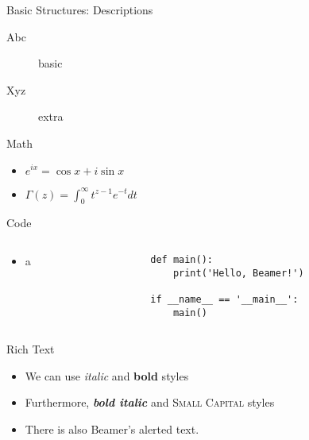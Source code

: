 \documentclass[12pt,t,hyperref={pdfencoding=auto}]{beamer}
\begin{document}
\begin{frame}{Basic Structures: Descriptions}
  \begin{description}
  \item[Abc] basic
  \item[Xyz] extra
  \end{description}
\end{frame}


\begin{frame}[fragile]{Math}
  \begin{itemize}
    \item $e^{ix} = \cos x + i \sin x$
    \item $\Gamma(z) = \int_0^\infty t^{z-1} e^{-t} dt$
  \end{itemize}
\end{frame}


\begin{frame}[fragile]{Code}
  \begin{columns}
    \begin{column}{0.5\textwidth}
      \begin{itemize}
        \item a
      \end{itemize}
    \end{column}
    \begin{column}{0.5\textwidth}
      \begin{verbatim}
def main():
    print('Hello, Beamer!')

if __name__ == '__main__':
    main()
      \end{verbatim}
    \end{column}
  \end{columns}
\end{frame}


\begin{frame}{Rich Text}
  \begin{itemize}
  \item We can use \textit{italic} and \textbf{bold} styles
  \item Furthermore, \textit{\textbf{bold italic}} and \textsc{Small Capital} styles
  \item There is also Beamer's \alert{alerted text}.
  \end{itemize}
\end{frame}
\end{document}
